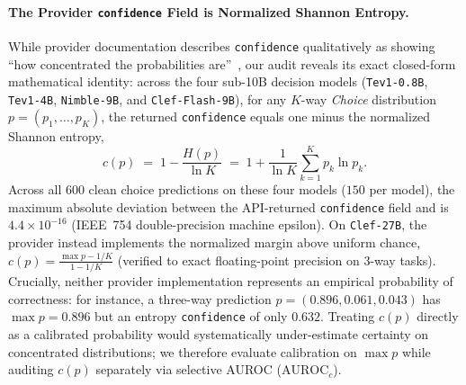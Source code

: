 \documentclass[10pt]{article}
\begin{document}
\paragraph{The Provider \texttt{confidence} Field is Normalized Shannon Entropy.}
While provider documentation describes \texttt{confidence} qualitatively as showing ``how concentrated the probabilities are''~\cite{ollama2026tev1}, our audit reveals its exact closed-form mathematical identity: across the four sub-10B decision models (\texttt{Tev1-0.8B}, \texttt{Tev1-4B}, \texttt{Nimble-9B}, and \texttt{Clef-Flash-9B}), for any $K$-way \emph{Choice} distribution $p = (p_1, \dots, p_K)$, the returned \texttt{confidence} equals one minus the normalized Shannon entropy,
\begin{equation}
c(p) \;=\; 1 - \frac{H(p)}{\ln K} \;=\; 1 + \frac{1}{\ln K} \sum_{k=1}^K p_k \ln p_k.
\label{eq:entropy-conf}
\end{equation}
Across all $600$ clean choice predictions on these four models ($150$ per model), the maximum absolute deviation between the API-returned \texttt{confidence} field and  is $4.4 \times 10^{-16}$ (IEEE~754 double-precision machine epsilon).
On \texttt{Clef-27B}, the provider instead implements the normalized margin above uniform chance, $c(p) = \frac{\max p - 1/K}{1 - 1/K}$ (verified to exact floating-point precision on $3$-way tasks).
Crucially, neither provider implementation represents an empirical probability of correctness: for instance, a three-way prediction $p = (0.896, 0.061, 0.043)$ has $\max p = 0.896$ but an entropy \texttt{confidence} of only $0.632$.
Treating $c(p)$ directly as a calibrated probability would systematically under-estimate certainty on concentrated distributions; we therefore evaluate calibration on $\max p$ while auditing $c(p)$ separately via selective AUROC ($\text{AUROC}_c$).
\end{document}
